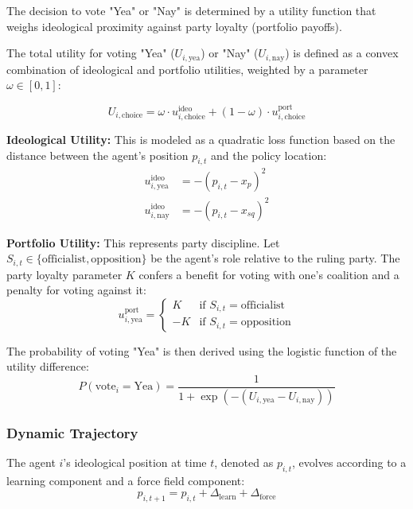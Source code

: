 \documentclass{article}
\begin{document}
	The decision to vote "Yea" or "Nay" is determined by a utility function that weighs ideological proximity against party loyalty (portfolio payoffs).
	
	The total utility for voting "Yea" ($U_{i,\text{yea}}$) or "Nay" ($U_{i,\text{nay}}$) is defined as a convex combination of ideological and portfolio utilities, weighted by a parameter $\omega \in [0,1]$:
	
	\begin{equation}
		U_{i, \text{choice}} = \omega \cdot u^{\text{ideo}}_{i, \text{choice}} + (1 - \omega) \cdot u^{\text{port}}_{i, \text{choice}}
	\end{equation}
	
	\textbf{Ideological Utility:} This is modeled as a quadratic loss function based on the distance between the agent's position $p_{i,t}$ and the policy location:
	\begin{align}
		u^{\text{ideo}}_{i, \text{yea}} &= -(p_{i,t} - x_p)^2 \\
		u^{\text{ideo}}_{i, \text{nay}} &= -(p_{i,t} - x_{sq})^2
	\end{align}
	
	\textbf{Portfolio Utility:} This represents party discipline. Let $S_{i,t} \in \{\text{officialist}, \text{opposition}\}$ be the agent's role relative to the ruling party. The party loyalty parameter $K$ confers a benefit for voting with one's coalition and a penalty for voting against it:
	\begin{equation}
		u^{\text{port}}_{i, \text{yea}} = 
		\begin{cases} 
			K & \text{if } S_{i,t} = \text{officialist} \\
			-K & \text{if } S_{i,t} = \text{opposition}
		\end{cases}
	\end{equation}
	
	The probability of voting "Yea" is then derived using the logistic function of the utility difference:
	\begin{equation}
		P(\text{vote}_i = \text{Yea}) = \frac{1}{1 + \exp\left(-(U_{i,\text{yea}} - U_{i,\text{nay}})\right)}
	\end{equation}
	
	\subsubsection{Dynamic Trajectory}
	The agent $i$'s ideological position at time $t$, denoted as $p_{i,t}$, evolves according to a learning component and a force field component:
	\begin{equation}
		p_{i, t+1} = p_{i,t} + \Delta_{\text{learn}} + \Delta_{\text{force}}
	\end{equation}
	
\end{document}
